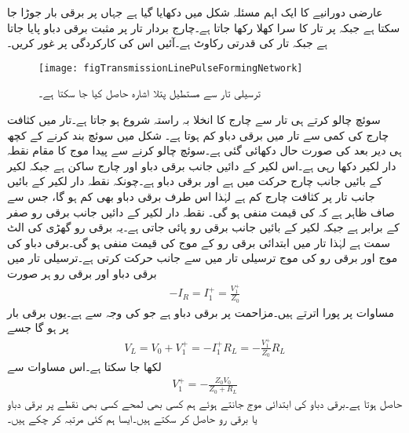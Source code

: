عارضی دورانیے کا ایک اہم مسئلہ شکل  میں دکھایا گیا ہے جہاں  پر برقی بار  جوڑا جا سکتا ہے جبکہ  پر تار کا سرا کھلا رکھا جاتا ہے۔چارج بردار تار پر  مثبت برقی دباو پایا جاتا ہے جبکہ تار کی قدرتی رکاوٹ  ہے۔آئیں اس کی کارکردگی پر غور کریں۔  
\begin{figure}
\centering
\texttt{[image: figTransmissionLinePulseFormingNetwork]}
\caption{ترسیلی تار سے مستطیل پتلا اشارہ حاصل کیا جا سکتا ہے۔}
\label{شکل_ترسیلی_مستطیل_اشارہ}
\end{figure}
سوئچ چالو کرتے ہی تار سے  چارج کا انخلا بہ راستہ  شروع ہو جاتا ہے۔تار میں کثافت چارج کی کمی سے تار میں برقی دباو کم ہوتا ہے۔ شکل  میں سوئچ بند کرنے کے کچھ ہی دیر بعد کی صورت حال دکھائی گئی ہے۔سوئچ چالو کرنے سے پیدا موج کا مقام نقطہ دار لکیر  دکھا رہی ہے۔اس لکیر کے دائیں جانب برقی دباو  اور چارج ساکن ہے جبکہ لکیر کے بائیں جانب چارج حرکت میں ہے اور برقی دباو  ہے۔چونکہ نقطہ دار لکیر کے بائیں جانب تار پر کثافت چارج کم ہے لہٰذا اس طرف برقی دباو بھی کم ہو گا، جس سے صاف ظاہر ہے کہ  کی قیمت منفی ہو گی۔ نقطہ دار لکیر کے دائیں جانب برقی رو صفر کے برابر ہے جبکہ لکیر کے بائیں جانب برقی رو پائی جاتی ہے۔یہ برقی رو گھڑی کی الٹ سمت ہے لہٰذا تار میں ابتدائی برقی رو کے موج  کی قیمت منفی ہو گی۔برقی دباو کی موج  اور برقی رو کی موج   ترسیلی تار میں  سے  جانب حرکت کرتی ہے۔ترسیلی تار میں برقی دباو اور برقی رو ہر صورت 
\begin{align*}
-I_R=I_1^+=\frac{V_1^+}{Z_0}
\end{align*}
مساوات پر پورا اترتے ہیں۔مزاحمت  پر برقی دباو  ہے جو  کی وجہ سے ہے۔یوں برقی بار پر  ہو گا جسے
\begin{align*}
V_L=V_0 +V_1^+ =-I_1^+ R_L=-\frac{V_1^+}{Z_0} R_L
\end{align*}
لکھا جا سکتا ہے۔اس مساوات سے
\begin{align}\label{مساوات_ترسیلی_ابتدائی_برقی_مستطیل_اشارہ}
V_1^+=-\frac{Z_0 V_0}{Z_0+R_L}
\end{align}
حاصل ہوتا ہے۔برقی دباو کی ابتدائی موج جانتے ہوئے ہم کسی بھی لمحے کسی بھی نقطے پر برقی دباو یا برقی رو حاصل کر سکتے ہیں۔ایسا ہم کئی مرتبہ کر چکے ہیں۔

